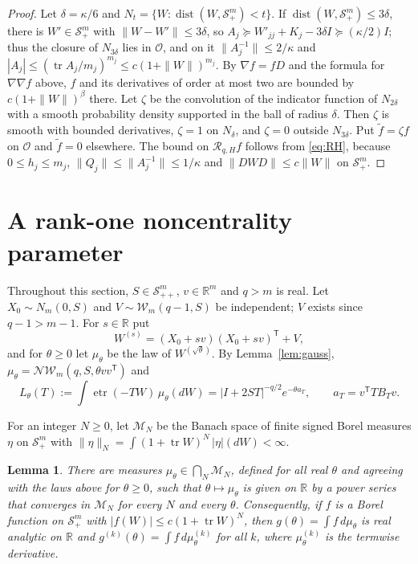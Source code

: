 \documentclass{amsart}
\newtheorem{lemma}[theorem]{Lemma}
\theoremstyle{definition}
\theoremstyle{remark}
\numberwithin{equation}{section}
\newcommand{\R}{\mathbb{R}}
\newcommand{\Sym}{\mathcal{S}}
\newcommand{\W}{\mathcal{W}}
\newcommand{\NW}{\mathcal{N}\!\mathcal{W}}
\newcommand{\M}{\mathcal{M}}
\newcommand{\Rop}{\mathcal{R}}
\newcommand{\tr}{\operatorname{tr}}
\newcommand{\etr}{\operatorname{etr}}
\newcommand{\dist}{\operatorname{dist}}
\begin{document}
\begin{proof}
Let $\delta=\kappa/6$ and $N_t=\{W:\dist(W,\Sym^m_+)<t\}$. If $\dist(W,\Sym^m_+)\le3\delta$, there is $W'\in\Sym^m_+$ with $\|W-W'\|\le3\delta$, so $A_j\succeq W'_{jj}+K_j-3\delta I\succeq(\kappa/2)I$; thus the closure of $N_{3\delta}$ lies in $\mathcal O$, and on it $\|A_j^{-1}\|\le2/\kappa$ and $|A_j|\le(\tr A_j/m_j)^{m_j}\le c(1+\|W\|)^{m_j}$. By $\nabla f=fD$ and the formula for $\nabla\nabla f$ above, $f$ and its derivatives of order at most two are bounded by $c(1+\|W\|)^\beta$ there. Let $\zeta$ be the convolution of the indicator function of $N_{2\delta}$ with a smooth probability density supported in the ball of radius $\delta$. Then $\zeta$ is smooth with bounded derivatives, $\zeta=1$ on $N_\delta$, and $\zeta=0$ outside $N_{3\delta}$. Put $\tilde f=\zeta f$ on $\mathcal O$ and $\tilde f=0$ elsewhere. The bound on $\Rop_{q,H}f$ follows from \eqref{eq:RH}, because $0\le h_j\le m_j$, $\|Q_j\|\le\|A_j^{-1}\|\le1/\kappa$ and $\|DWD\|\le c\|W\|$ on $\Sym^m_+$.
\end{proof}

\section{A rank-one noncentrality parameter}\label{sec:rankone}

Throughout this section, $S\in\Sym^m_{++}$, $v\in\R^m$ and $q>m$ is real. Let $X_0\sim N_m(0,S)$ and $V\sim\W_m(q-1,S)$ be independent; $V$ exists since $q-1>m-1$. For $s\in\R$ put
\[
W^{(s)}=(X_0+sv)(X_0+sv)^{\mathsf T}+V,
\]
and for $\theta\ge0$ let $\mu_\theta$ be the law of $W^{(\sqrt\theta)}$. By Lemma~\ref{lem:gauss}, $\mu_\theta=\NW_m(q,S,\theta vv^{\mathsf T})$ and
\begin{equation}\label{eq:Ltheta}
L_\theta(T):=\int\etr(-TW)\,\mu_\theta(dW)=|I+2ST|^{-q/2}e^{-\theta a_T},\qquad a_T=v^{\mathsf T}TB_Tv .
\end{equation}

For an integer $N\ge0$, let $\M_N$ be the Banach space of finite signed Borel measures $\eta$ on $\Sym^m_+$ with $\|\eta\|_N=\int(1+\tr W)^N\,|\eta|(dW)<\infty$.

\begin{lemma}\label{lem:analytic}
There are measures $\mu_\theta\in\bigcap_N\M_N$, defined for all real $\theta$ and agreeing with the laws above for $\theta\ge0$, such that $\theta\mapsto\mu_\theta$ is given on $\R$ by a power series that converges in $\M_N$ for every $N$ and every $\theta$. Consequently, if $f$ is a Borel function on $\Sym^m_+$ with $|f(W)|\le c(1+\tr W)^N$, then $g(\theta)=\int f\,d\mu_\theta$ is real analytic on $\R$ and $g^{(k)}(\theta)=\int f\,d\mu_\theta^{(k)}$ for all $k$, where $\mu_\theta^{(k)}$ is the termwise derivative.
\end{lemma}
\end{document}
